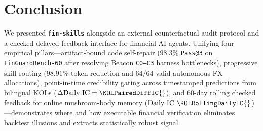 \section{Conclusion}
\label{sec:conclusion}
\vspace{-0.08cm}
We presented \textbf{\texttt{fin-skills}} alongside an external counterfactual audit protocol and a checked delayed-feedback interface for financial AI agents. Unifying four empirical pillars---artifact-bound code self-repair ($98.3\%$ \texttt{Pass@3} on \texttt{FinGuardBench-60} after resolving Beacon \texttt{C0--C3} harness bottlenecks), progressive skill routing ($98.91\%$ token reduction and $64/64$ valid autonomous FX allocations), point-in-time credibility gating across \KOLPredRows{} timestamped predictions from \KOLTotalAccounts{} bilingual KOLs ($\Delta\text{Daily IC} = \KOLPairedDiffIC{}$), and 60-day rolling checked feedback for online mushroom-body memory ($\text{Daily IC } \KOLRollingDailyIC{}$)---demonstrates where and how executable financial verification eliminates backtest illusions and extracts statistically robust signal.

\clearpage

